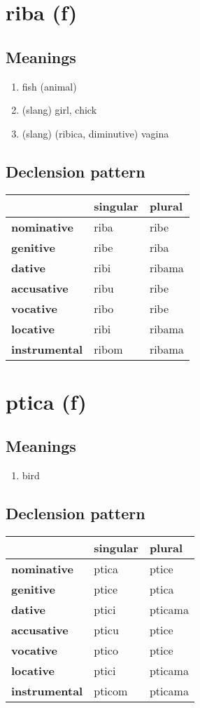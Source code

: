\filbreak
\section{riba (f)}
\subsection*{Meanings}
\begin{enumerate}
\item fish (animal)
\item (slang) girl, chick
\item (slang) (ribica, diminutive) vagina
\end{enumerate}
\subsection*{Declension pattern}
\begin{tabularx}{\linewidth}{Xll}
\toprule
{} & singular &  plural \\
\midrule
\textbf{nominative  } &     riba &    ribe \\
\textbf{genitive    } &     ribe &    riba \\
\textbf{dative      } &     ribi &  ribama \\
\textbf{accusative  } &     ribu &    ribe \\
\textbf{vocative    } &     ribo &    ribe \\
\textbf{locative    } &     ribi &  ribama \\
\textbf{instrumental} &    ribom &  ribama \\
\bottomrule
\end{tabularx}

\filbreak
\section{ptica (f)}
\subsection*{Meanings}
\begin{enumerate}
\item bird
\end{enumerate}
\subsection*{Declension pattern}
\begin{tabularx}{\linewidth}{Xll}
\toprule
{} & singular &   plural \\
\midrule
\textbf{nominative  } &    ptica &    ptice \\
\textbf{genitive    } &    ptice &    ptica \\
\textbf{dative      } &    ptici &  pticama \\
\textbf{accusative  } &    pticu &    ptice \\
\textbf{vocative    } &    ptico &    ptice \\
\textbf{locative    } &    ptici &  pticama \\
\textbf{instrumental} &   pticom &  pticama \\
\bottomrule
\end{tabularx}

